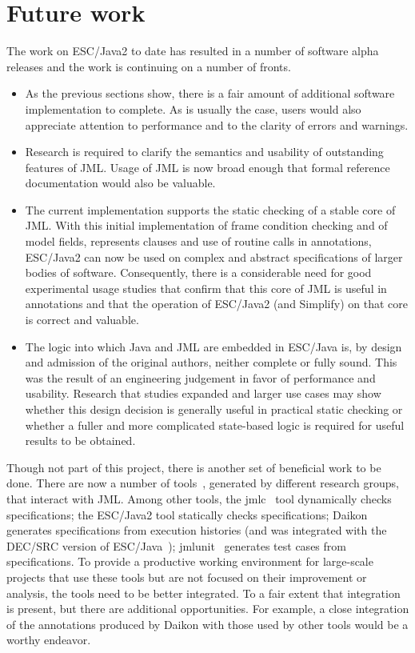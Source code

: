 \documentclass{acm_proc_article-sp}
\begin{document}
\section{Future work}
The work on ESC/Java2 to date has resulted in a number of software
alpha releases and the work is continuing on a number of fronts.
\begin{itemize}
\item As the previous sections show, there is a fair amount of
  additional software implementation to complete.  As is usually the
  case, users would also appreciate attention to performance and to
  the clarity of errors and warnings.
\item Research is required to clarify the semantics and usability of
  outstanding features of JML.  Usage of JML is now broad enough that
  formal reference documentation would also be valuable.
\item The current implementation supports the static checking of a
  stable core of JML.  With this initial implementation of frame
  condition checking and of model fields, represents clauses and use
  of routine calls in annotations, ESC/Java2 can now be used on
  complex and abstract specifications of larger bodies of software.
  Consequently, there is a considerable need for good experimental
  usage studies that confirm that this core of JML is useful in
  annotations and that the operation of ESC/Java2 (and Simplify) on
  that core is correct and valuable.
\item The logic into which Java and JML are embedded in ESC/Java is,
  by design and admission of the original authors, neither complete or
  fully sound.  This was the result of an engineering judgement in
  favor of performance and usability.  Research that studies expanded
  and larger use cases may show whether this design decision is
  generally useful in practical static checking or whether a fuller
  and more complicated state-based logic is required for useful
  results to be obtained.
\end{itemize}

Though not part of this project, there is another set of beneficial
work to be done.  There are now a number of tools~\cite{Burdy-etal03},
generated by different research groups, that interact with JML.  Among
other tools, the jmlc~\cite{Cheon-Leavens02b} tool dynamically checks
specifications; the ESC/Java2 tool statically checks specifications;
Daikon generates specifications from execution histories (and was
integrated with the DEC/SRC version of ESC/Java~\cite{NimmerErnst01});
jmlunit~\cite{Cheon-Leavens02} generates test cases from
specifications.  To provide a productive working environment for
large-scale projects that use these tools but are not focused on their
improvement or analysis, the tools need to be better integrated.  To a
fair extent that integration is present, but there are additional
opportunities.  For example, a close integration of the annotations
produced by Daikon with those used by other tools would be a worthy
endeavor.
\end{document}
